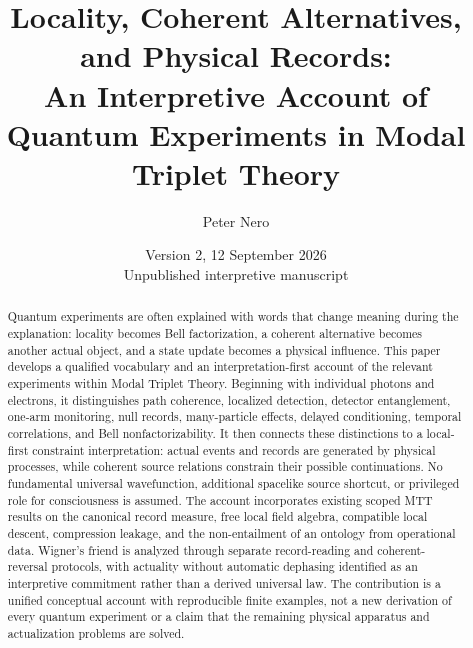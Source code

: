 \documentclass[11pt,a4paper]{article}
\title{Locality, Coherent Alternatives, and Physical Records:\\
An Interpretive Account of Quantum Experiments in Modal Triplet Theory}
\author{Peter Nero}
\date{Version 2, 12 September 2026\\Unpublished interpretive manuscript}
\begin{document}
\maketitle
\begin{abstract}
Quantum experiments are often explained with words that change meaning during the explanation: locality becomes Bell factorization, a coherent alternative becomes another actual object, and a state update becomes a physical influence. This paper develops a qualified vocabulary and an interpretation-first account of the relevant experiments within Modal Triplet Theory. Beginning with individual photons and electrons, it distinguishes path coherence, localized detection, detector entanglement, one-arm monitoring, null records, many-particle effects, delayed conditioning, temporal correlations, and Bell nonfactorizability. It then connects these distinctions to a local-first constraint interpretation: actual events and records are generated by physical processes, while coherent source relations constrain their possible continuations. No fundamental universal wavefunction, additional spacelike source shortcut, or privileged role for consciousness is assumed. The account incorporates existing scoped MTT results on the canonical record measure, free local field algebra, compatible local descent, compression leakage, and the non-entailment of an ontology from operational data. Wigner's friend is analyzed through separate record-reading and coherent-reversal protocols, with actuality without automatic dephasing identified as an interpretive commitment rather than a derived universal law. The contribution is a unified conceptual account with reproducible finite examples, not a new derivation of every quantum experiment or a claim that the remaining physical apparatus and actualization problems are solved.
\end{abstract}
\end{document}
